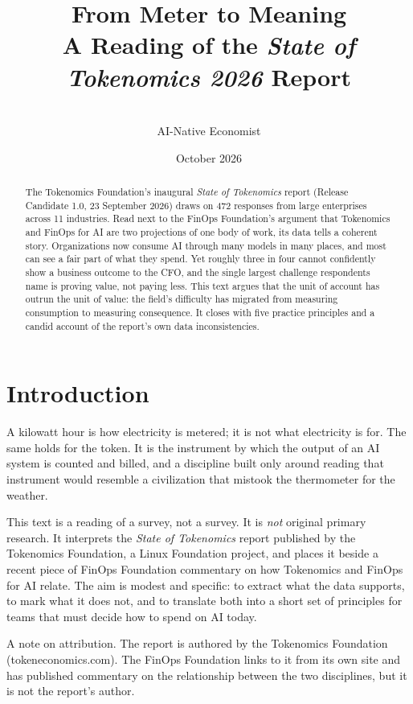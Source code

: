 \documentclass[11pt,a4paper]{article}
\title{\textbf{From Meter to Meaning}\\[0.3em]
\large A Reading of the \emph{State of Tokenomics 2026} Report}
\author{\paperauthor\\[0.35em]
  {\normalsize\color{muted}AI-Native Economist}}
\date{October 2026}
\begin{document}
\maketitle

\begin{abstract}
\noindent
The Tokenomics Foundation's inaugural \emph{State of Tokenomics} report (Release Candidate 1.0, 23 September 2026) draws on 472 responses from large enterprises across 11 industries. Read next to the FinOps Foundation's argument that Tokenomics and FinOps for AI are two projections of one body of work, its data tells a coherent story. Organizations now consume AI through many models in many places, and most can see a fair part of what they spend. Yet roughly three in four cannot confidently show a business outcome to the CFO, and the single largest challenge respondents name is proving value, not paying less. This text argues that the unit of account has outrun the unit of value: the field's difficulty has migrated from measuring consumption to measuring consequence. It closes with five practice principles and a candid account of the report's own data inconsistencies.
\end{abstract}

\section{Introduction}

A kilowatt hour is how electricity is metered; it is not what electricity is for. The same holds for the token. It is the instrument by which the output of an AI system is counted and billed, and a discipline built only around reading that instrument would resemble a civilization that mistook the thermometer for the weather.

This text is a reading of a survey, not a survey. It is \emph{not} original primary research. It interprets the \emph{State of Tokenomics} report published by the Tokenomics Foundation, a Linux Foundation project, and places it beside a recent piece of FinOps Foundation commentary on how Tokenomics and FinOps for AI relate. The aim is modest and specific: to extract what the data supports, to mark what it does not, and to translate both into a short set of principles for teams that must decide how to spend on AI today.

A note on attribution. The report is authored by the Tokenomics Foundation (tokeneconomics.com). The FinOps Foundation links to it from its own site and has published commentary on the relationship between the two disciplines, but it is not the report's author.
\end{document}
